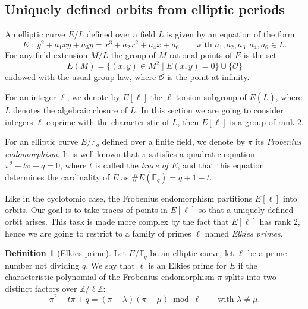 \documentclass[12pt]{article}
\theoremstyle{plain}
\theoremstyle{definition}
\newtheorem{definition}[theorem]{Definition}
\def\Z{\ensuremath{\mathbb{Z}}}
\def\F{\ensuremath{\mathbb{F}}}
\begin{document}
\subsection{Uniquely defined orbits from elliptic periods}
\label{sec:ellperiods}

An elliptic curve $E/L$ defined over a field $L$ is given by an
equation of the form
\begin{equation*}
  E\;:\; y^2 + a_1xy + a_3y = x^3 + a_2x^2 + a_4x + a_6
  \qquad\text{with $a_1,a_2,a_3,a_4,a_6\in L$.}
\end{equation*}
For any field extension $M/L$ the group of $M$-rational points of $E$
is the set
\begin{equation*}
  E(M) = \{(x,y)\in M^2 \mid E(x,y) = 0\} \cup \{\mathcal{O}\}
\end{equation*}
endowed with the usual group law, where $\mathcal{O}$ is the point at
infinity.

For an integer $\ell$, we denote by $E[\ell]$ the $\ell$-torsion
subgroup of $E(\bar{L})$, where $\bar{L}$ denotes the algebraic
closure of $L$. In this section we are going to consider integers
$\ell$ coprime with the characteristic of $L$, then $E[\ell]$ is a
group of rank $2$.

For an elliptic curve $E/\F_q$ defined over a finite field, we denote
by $\pi$ its \emph{Frobenius endomorphism}. It is well known that
$\pi$ satisfies a quadratic equation $\pi^2-t\pi+q=0$, where $t$ is
called the \emph{trace of $E$}, and that this equation determines the
cardinality of $E$ as $\#E(\F_q)=q+1-t$.

Like in the cyclotomic case, the Frobenius endomorphism partitions
$E[\ell]$ into orbits. Our goal is to take traces of points in
$E[\ell]$ so that a uniquely defined orbit arises. This task is made
more complex by the fact that $E[\ell]$ has rank 2, hence we are going
to restrict to a family of primes $\ell$ named \emph{Elkies primes}.

\begin{definition}[Elkies prime]
  Let $E/\F_q$ be an elliptic curve, let $\ell$ be a prime number not
  dividing $q$.  We say that $\ell$ is an Elkies prime for $E$ if the
  characteristic polynomial of the Frobenius endomorphism $\pi$ splits
  into two distinct factors over $\Z/\ell\Z$:
\begin{equation}
\pi^2-t\pi+q=(\pi-\lambda)(\pi-\mu)\bmod\ell
\qquad\text{with $\lambda\ne\mu$}.
\end{equation}
\end{definition}
\end{document}
